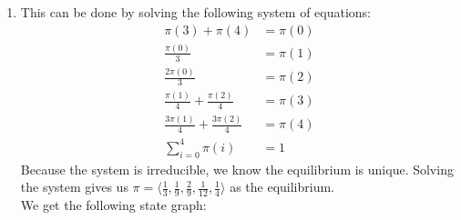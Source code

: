 \documentclass[14pt,letterpaper]{extarticle}
\begin{document}
\begin{center}
\begin{enumerate}
    Clearly if the system is periodic ($N$ is even), then $\pi$ is not a stable equilibrium. If the system is aperiodic, then $\pi$ \textit{is} a stable equilibrium, which is justified by Theorem 7 in section 7.2.
\item
    This can be done by solving the following system of equations:
    \begin{align*}
        \pi(3)+\pi(4)&=\pi(0) \\
        \frac{\pi(0)}{3}&=\pi(1) \\
        \frac{2\pi(0)}{3}&=\pi(2) \\
        \frac{\pi(1)}{4}+\frac{\pi(2)}{4}&= \pi(3) \\
        \frac{3\pi(1)}{4}+\frac{3\pi(2)}{4}&= \pi(4)  \\
        \sum_{i=0}^4\pi(i)&=1 
    \end{align*}
    Because the system is irreducible, we know the equilibrium is unique. Solving the system gives us $\pi=\langle\frac{1}{3},\frac{1}{9},\frac{2}{9},\frac{1}{12},\frac{1}{4}\rangle$ as the equilibrium.  \\
    We get the following state graph:


\end{enumerate}
\end{center}
\end{document}
